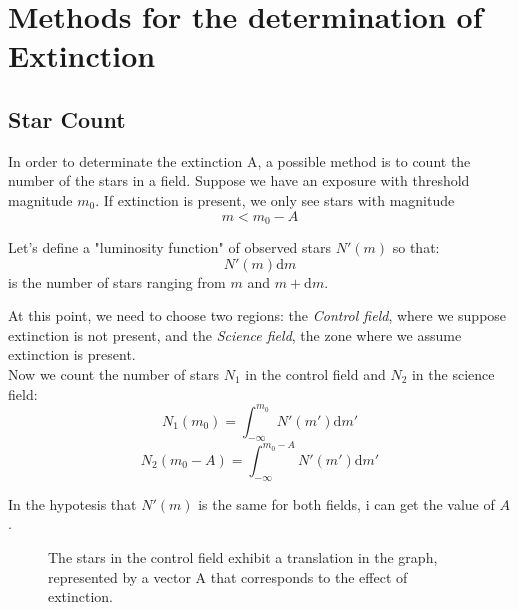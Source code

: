 \documentclass[a4paper,11pt,twoside]{book}
\newcommand{\de}[0]{\textrm{d}}
\begin{document}
\chapter{Methods for the determination of Extinction}

\section{Star Count}
In order to determinate the extinction A, a possible method is to count the number of the stars in a field. Suppose we have an exposure with threshold magnitude $m_0$. If extinction is present, we only see stars with magnitude 
\begin{equation}
	m < m_0 - A
\end{equation}

Let's define a "luminosity function" of observed stars $N'(m)$ so that:
\begin{equation}
	N'(m)\de m
\end{equation}
is the number of stars ranging from $m$ and $m+\de m$.

At this point, we need to choose two regions: the \textit{Control field}, where we suppose extinction is not present, and the \textit{Science field}, the zone where we assume extinction is present.\\

Now we count the number of stars $N_1$ in the control field and $N_2$ in the science field:
\begin{equation}
	N_1(m_0) = \int_{-\infty}^{m_0} N'(m')\de m'
\end{equation}
\begin{equation}
	N_2(m_0-A) = \int_{-\infty}^{m_0-A} N'(m')\de m'
\end{equation}

In the hypotesis that $N'(m)$ is the same for both fields, i can get the value of $A$.
\begin{figure}[H]
	\begin{center}
		
	\end{center}
		\caption{The stars in the control field exhibit a translation in the graph, represented by a vector A that corresponds to the effect of extinction. }
\end{figure}
\end{document}
